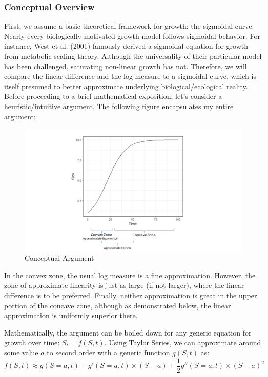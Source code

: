 \documentclass[]{article}
\begin{document}
\subsubsection{Conceptual Overview}\label{conceptual-overview}

First, we assume a basic theoretical framework for growth: the sigmoidal
curve. Nearly every biologically motivated growth model follows
sigmoidal behavior. For instance, West et al. (2001) famously derived a
sigmoidal equation for growth from metabolic scaling theory. Although
the universality of their particular model has been challenged,
saturating non-linear growth has not. Therefore, we will compare the
linear difference and the log measure to a sigmoidal curve, which is
itself presumed to better approximate underlying biological/ecological
reality. Before proceeding to a brief mathematical exposition, let's
consider a heuristic/intuitive argument. The following figure
encapsulates my entire argument:

\begin{figure}
\includegraphics[width=1\linewidth]{Conceptual_Fig} \caption{Conceptual Argument}\label{fig:unnamed-chunk-2}
\end{figure}

In the convex zone, the usual log measure is a fine approximation.
However, the zone of approximate linearity is just as large (if not
larger), where the linear difference is to be preferred. Finally,
neither approximation is great in the upper portion of the concave zone,
although as demonstrated below, the linear approximation is uniformly
superior there.

Mathematically, the argument can be boiled down for any generic equation
for growth over time: \(S_t = f(S,t)\). Using Taylor Series, we can
approximate around some value \(a\) to second order with a generic
function \(g(S,t)\) as:
\[f(S,t) \approx g(S=a,t) + g'(S=a,t) \times (S-a) + \frac{1}{2}g''(S=a,t)\times(S-a)^2\]
\end{document}
